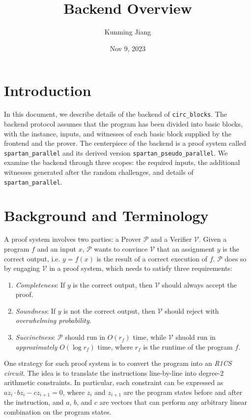 \documentclass{article}
\title{Backend Overview}
\author{Kunming Jiang}
\date{Nov 9, 2023}
\newcommand{\code}{\texttt}
\renewcommand{\P}{\mathcal{P}}
\newcommand{\V}{\mathcal{V}}
\begin{document}
\maketitle

\section{Introduction}\label{sec:intro}

In this document, we describe details of the backend of \code{circ\_blocks}. The backend protocol assumes that the program has been divided into basic blocks, with the instance, inputs, and witnesses of each basic block supplied by the frontend and the prover. The centerpiece of the backend is a proof system called \code{spartan\_parallel} and its derived version \code{spartan\_pseudo\_parallel}. We examine the backend through three scopes: the required inputs, the additional witnesses generated after the random challenges, and details of \code{spartan\_parallel}.


\section{Background and Terminology}\label{sec:term}

A proof system involves two parties: a Prover $\P$ and a Verifier $\V$. Given a program $f$ and an input $x$, $\P$ wants to convince $\V$ that an assignment $y$ is the correct output, i.e. $y = f(x)$ is the result of a correct execution of $f$. $\P$ does so by engaging $\V$ in a proof system, which needs to satisfy three requirements:
\begin{enumerate}
    \item\label{req:complete} \emph{Completeness}: If $y$ is the correct output, then $\V$ should always accept the proof.
    \item\label{req:sound} \emph{Soundness}: If $y$ is not the correct output, then $\V$ should reject with \emph{overwhelming probability}.
    \item\label{req:succinct} \emph{Succinctness}: $\P$ should run in $O(r_f)$ time, while $\V$ shuold run in \emph{approximately} $O(\log r_f)$ time, where $r_f$ is the runtime of the program $f$.
\end{enumerate}

One strategy for such proof system is to convert the program into an \emph{R1CS circuit}. The idea is to translate the instructions line-by-line into degree-2 arithmetic constraints. In particular, each constraint can be expressed as $az_i\cdot bz_i - cz_{i+1} = 0$, where $z_i$ and $z_{i+1}$ are the program states before and after the instruction, and $a$, $b$, and $c$ are vectors that can perform any arbitrary linear combination on the program states.
\end{document}
